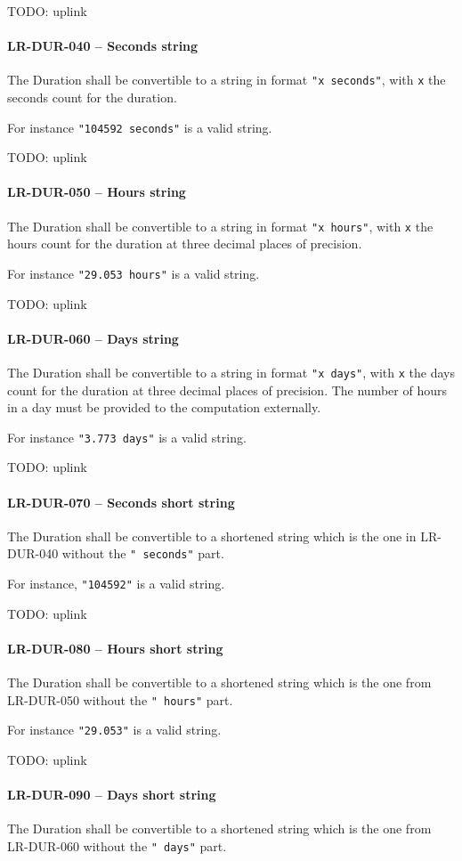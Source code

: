 TODO: uplink
\paragraph{LR-DUR-040 -- Seconds string}
The Duration shall be convertible to a string in format
\lstinline{"x seconds"}, with \lstinline{x} the seconds count
for the duration.

For instance \lstinline{"104592 seconds"} is a valid string.

TODO: uplink
\paragraph{LR-DUR-050 -- Hours string}
The Duration shall be convertible to a string in format
\lstinline{"x hours"}, with \lstinline{x} the hours count
for the duration at three decimal places of precision.

For instance \lstinline{"29.053 hours"} is a valid string.

TODO: uplink
\paragraph{LR-DUR-060 -- Days string}
The Duration shall be convertible to a string in format
\lstinline{"x days"}, with \lstinline{x} the days count
for the duration at three decimal places of precision.
The number of hours in a day must be provided to the
computation externally.

For instance \lstinline{"3.773 days"} is a valid string.

TODO: uplink
\paragraph{LR-DUR-070 -- Seconds short string}
The Duration shall be convertible to a shortened string which
is the one in LR-DUR-040 without the \lstinline{" seconds"}
part.

For instance, \lstinline{"104592"} is a valid string.

TODO: uplink
\paragraph{LR-DUR-080 -- Hours short string}
The Duration shall be convertible to a shortened string
which is the one from LR-DUR-050 without the \lstinline{" hours"}
part.

For instance \lstinline{"29.053"} is a valid string.

TODO: uplink
\paragraph{LR-DUR-090 -- Days short string}
The Duration shall be convertible to a shortened string
which is the one from LR-DUR-060 without the \lstinline{" days"}
part.

